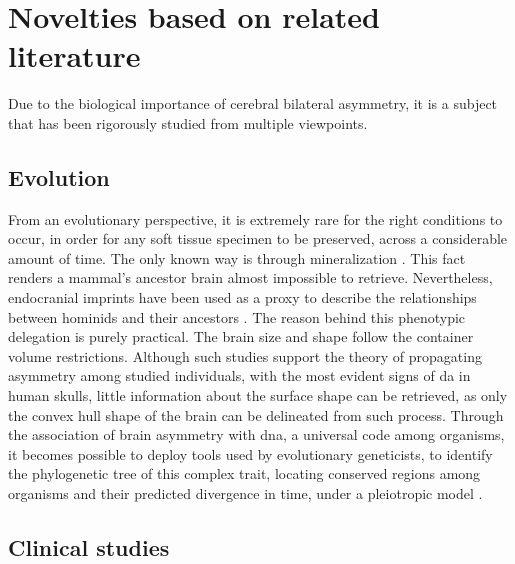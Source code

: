 \section{Novelties based on related literature} 
 Due to the biological importance of cerebral bilateral asymmetry, it is a subject that has been rigorously studied from multiple viewpoints.
 \subsection{Evolution}
 From an evolutionary perspective, it is extremely rare for the right conditions to occur, in order for any soft tissue specimen to be preserved, across a considerable amount of time. The only known way is through mineralization \cite{Purnell2018}. This fact renders a mammal's ancestor brain almost impossible to retrieve. Nevertheless, endocranial imprints have been used as a proxy to describe the relationships between hominids and their ancestors \cite{Balzeau2012}\cite{Neubauer2020}. The reason behind this phenotypic delegation is purely practical. The brain size and shape follow the container volume restrictions. Although such studies support the theory of propagating asymmetry among studied individuals, with the most evident signs of \ac{da} in human skulls, little information about the surface shape can be retrieved, as only the convex hull shape of the brain can be delineated from such process. Through the association of brain asymmetry with \acs{dna}, a universal code among organisms, it becomes possible to deploy tools used by evolutionary geneticists, to identify the phylogenetic tree of this complex trait, locating conserved regions among organisms and their predicted divergence in time, under a pleiotropic model \cite{Koch2021}.
 \subsection{Clinical studies}
 